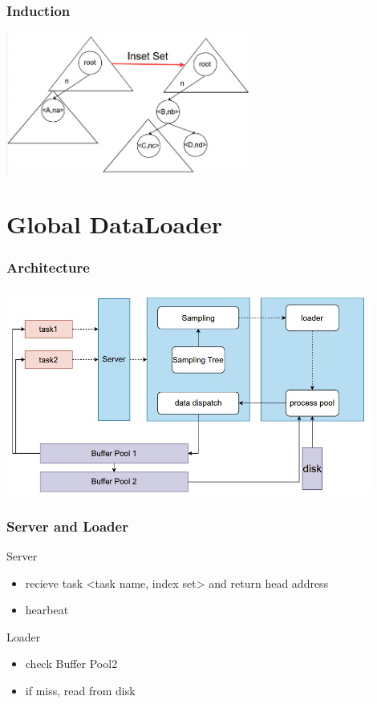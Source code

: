 \documentclass[notheorems, aspectratio=54]{beamer}
\begin{document}
\begin{frame}
    \frametitle{Induction}
    \centering
    \includegraphics[width=8cm]{global_img_dir/Inser.png}
\end{frame}

\section{Global DataLoader}
\begin{frame}
    \frametitle{Architecture}
    \centering
    \includegraphics[width=12cm]{global_img_dir/archi.png}
\end{frame}

\begin{frame}
    \frametitle{Server and Loader}
    \begin{block}{Server}
        \begin{itemize}
            \item recieve task <task name, index set> and return head address
            \item hearbeat
        \end{itemize}
    \end{block}
    \begin{block}{Loader}
        \begin{itemize}
            \item check Buffer Pool2
            \item if miss, read from disk
        \end{itemize}
    \end{block}
\end{frame}
\end{document}
